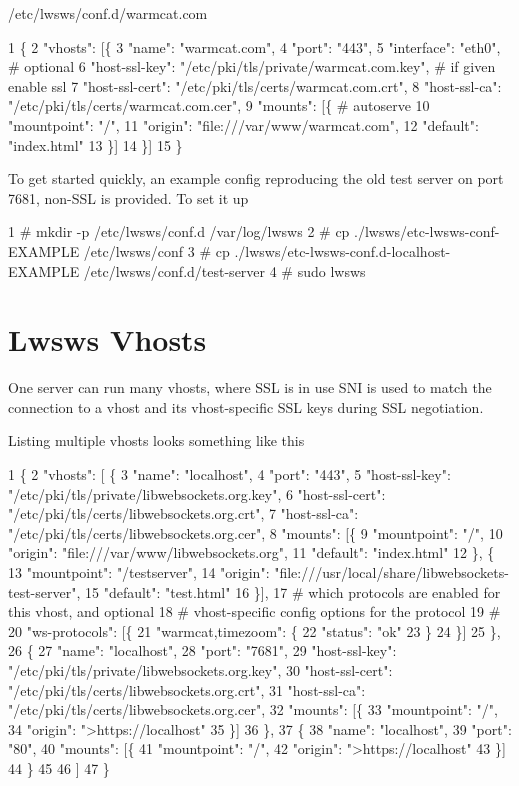 /etc/lwsws/conf.d/warmcat.\+com 
\begin{DoxyCode}
1 \{
2         "vhosts": [\{
3                 "name": "warmcat.com",
4                 "port": "443",
5                 "interface": "eth0",  # optional
6                 "host-ssl-key": "/etc/pki/tls/private/warmcat.com.key",  # if given enable ssl
7                 "host-ssl-cert": "/etc/pki/tls/certs/warmcat.com.crt",
8                 "host-ssl-ca": "/etc/pki/tls/certs/warmcat.com.cer",
9                 "mounts": [\{  # autoserve
10                         "mountpoint": "/",
11                         "origin": "file:///var/www/warmcat.com",
12                         "default": "index.html"
13                 \}]
14         \}]
15 \}
\end{DoxyCode}
 To get started quickly, an example config reproducing the old test server on port 7681, non-\/\+S\+SL is provided. To set it up 
\begin{DoxyCode}
1 # mkdir -p /etc/lwsws/conf.d /var/log/lwsws
2 # cp ./lwsws/etc-lwsws-conf-EXAMPLE /etc/lwsws/conf
3 # cp ./lwsws/etc-lwsws-conf.d-localhost-EXAMPLE /etc/lwsws/conf.d/test-server
4 # sudo lwsws
\end{DoxyCode}
\hypertarget{md_README.lwsws_lwswsv}{}\section{Lwsws Vhosts}\label{md_README.lwsws_lwswsv}
One server can run many vhosts, where S\+SL is in use S\+NI is used to match the connection to a vhost and its vhost-\/specific S\+SL keys during S\+SL negotiation.

Listing multiple vhosts looks something like this 
\begin{DoxyCode}
1 \{
2  "vhosts": [ \{
3      "name": "localhost",
4      "port": "443",
5      "host-ssl-key":  "/etc/pki/tls/private/libwebsockets.org.key",
6      "host-ssl-cert": "/etc/pki/tls/certs/libwebsockets.org.crt",
7      "host-ssl-ca":   "/etc/pki/tls/certs/libwebsockets.org.cer",
8      "mounts": [\{
9        "mountpoint": "/",
10        "origin": "file:///var/www/libwebsockets.org",
11        "default": "index.html"
12        \}, \{
13         "mountpoint": "/testserver",
14         "origin": "file:///usr/local/share/libwebsockets-test-server",
15         "default": "test.html"
16        \}],
17      # which protocols are enabled for this vhost, and optional
18      # vhost-specific config options for the protocol
19      #
20      "ws-protocols": [\{
21        "warmcat,timezoom": \{
22          "status": "ok"
23        \}
24      \}]
25     \},
26     \{
27     "name": "localhost",
28     "port": "7681",
29      "host-ssl-key":  "/etc/pki/tls/private/libwebsockets.org.key",
30      "host-ssl-cert": "/etc/pki/tls/certs/libwebsockets.org.crt",
31      "host-ssl-ca":   "/etc/pki/tls/certs/libwebsockets.org.cer",
32      "mounts": [\{
33        "mountpoint": "/",
34        "origin": ">https://localhost"
35      \}]
36    \},
37     \{
38     "name": "localhost",
39     "port": "80",
40      "mounts": [\{
41        "mountpoint": "/",
42        "origin": ">https://localhost"
43      \}]
44    \}
45 
46   ]
47 \}
\end{DoxyCode}


